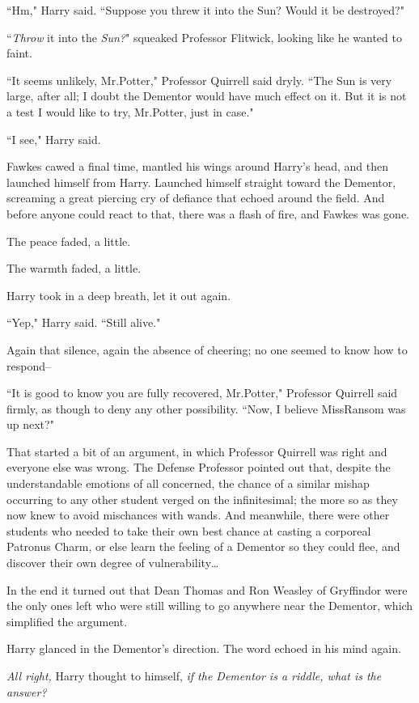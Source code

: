 ``Hm," Harry said. ``Suppose you threw it into the Sun? Would it be destroyed?"

``\emph{Throw} it into the \emph{Sun?}" squeaked Professor Flitwick, looking like he wanted to faint.

``It seems unlikely, Mr.\?Potter," Professor Quirrell said dryly. ``The Sun is very large, after all; I doubt the Dementor would have much effect on it. But it is not a test I would like to try, Mr.\?Potter, just in case."

``I see," Harry said.

Fawkes cawed a final time, mantled his wings around Harry's head, and then launched himself from Harry. Launched himself straight toward the Dementor, screaming a great piercing cry of defiance that echoed around the field. And before anyone could react to that, there was a flash of fire, and Fawkes was gone.

The peace faded, a little.

The warmth faded, a little.

Harry took in a deep breath, let it out again.

``Yep," Harry said. ``Still alive."

Again that silence, again the absence of cheering; no one seemed to know how to respond\---

``It is good to know you are fully recovered, Mr.\?Potter," Professor Quirrell said firmly, as though to deny any other possibility. ``Now, I believe Miss\?Ransom was up next?"

That started a bit of an argument, in which Professor Quirrell was right and everyone else was wrong. The Defense Professor pointed out that, despite the understandable emotions of all concerned, the chance of a similar mishap occurring to any other student verged on the infinitesimal; the more so as they now knew to avoid mischances with wands. And meanwhile, there were other students who needed to take their own best chance at casting a corporeal Patronus Charm, or else learn the feeling of a Dementor so they could flee, and discover their own degree of vulnerability{\ldots}

In the end it turned out that Dean Thomas and Ron Weasley of Gryffindor were the only ones left who were still willing to go anywhere near the Dementor, which simplified the argument.

Harry glanced in the Dementor's direction. The word echoed in his mind again.

\emph{All right,} Harry thought to himself, \emph{if the Dementor is a riddle, what is the answer?}

